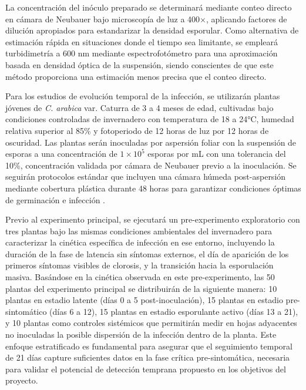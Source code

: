 \documentclass[12pt, a4paper]{article}
\begin{document}
	La concentración del inóculo preparado se determinará mediante conteo directo en cámara de Neubauer bajo microscopía de luz a 400×, aplicando factores de dilución apropiados para estandarizar la densidad esporular. Como alternativa de estimación rápida en situaciones donde el tiempo sea limitante, se empleará turbidimetría a 600 nm mediante espectrofotómetro para una aproximación basada en densidad óptica de la suspensión, siendo conscientes de que este método proporciona una estimación menos precisa que el conteo directo.
	
	Para los estudios de evolución temporal de la infección, se utilizarán plantas jóvenes de \textit{C. arabica} var. Caturra de 3 a 4 meses de edad, cultivadas bajo condiciones controladas de invernadero con temperatura de 18 a 24°C, humedad relativa superior al 85\% y fotoperiodo de 12 horas de luz por 12 horas de oscuridad. Las plantas serán inoculadas por aspersión foliar con la suspensión de esporas a una concentración de $1 \times 10^5$ esporas por mL con una tolerancia del 10\%, concentración validada por cámara de Neubauer previo a la inoculación. Se seguirán protocolos estándar que incluyen una cámara húmeda post-aspersión mediante cobertura plástica durante 48 horas para garantizar condiciones óptimas de germinación e infección \parencite{Talhinhas2017}.
	
	Previo al experimento principal, se ejecutará un pre-experimento exploratorio con tres plantas bajo las mismas condiciones ambientales del invernadero para caracterizar la cinética específica de infección en ese entorno, incluyendo la duración de la fase de latencia sin síntomas externos, el día de aparición de los primeros síntomas visibles de clorosis, y la transición hacia la esporulación masiva. Basándose en la cinética observada en este pre-experimento, las 50 plantas del experimento principal se distribuirán de la siguiente manera: 10 plantas en estadio latente (días 0 a 5 post-inoculación), 15 plantas en estadio pre-sintomático (días 6 a 12), 15 plantas en estadio esporulante activo (días 13 a 21), y 10 plantas como controles sistémicos que permitirán medir en hojas adyacentes no inoculadas la posible dispersión de la infección dentro de la planta. Este enfoque estratificado es fundamental para asegurar que el seguimiento temporal de 21 días capture suficientes datos en la fase crítica pre-sintomática, necesaria para validar el potencial de detección temprana propuesto en los objetivos del proyecto.
	
\end{document}
